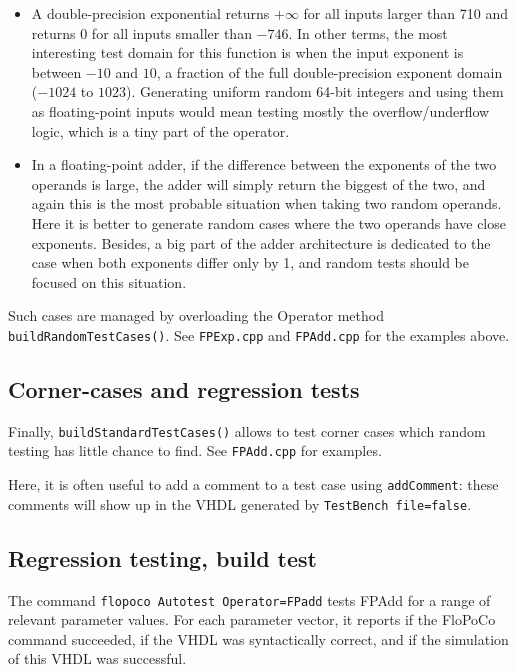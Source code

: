 \documentclass{article}
\begin{document}
\begin{itemize}\item 
  A double-precision exponential returns $+\infty$ for all inputs
  larger than 710 and returns $0$ for all inputs smaller than
  $-746$. In other terms, the most interesting test domain for this
  function is when the input exponent is between $-10$ and $10$, a
  fraction of the full double-precision exponent domain ($-1024$ to
  $1023$). Generating uniform random 64-bit integers and using them as
  floating-point inputs would mean testing mostly the
  overflow/underflow logic, which is a tiny part of the operator.


\item In a floating-point adder, if the difference between the
  exponents of the two operands is large, the adder will simply return
  the biggest of the two, and again this is the most probable
  situation when taking two random operands. Here it is better to
  generate random cases where the two operands have close
  exponents. Besides, a big part of the adder architecture is
  dedicated to the case when both exponents differ only by 1, and
  random tests should be focused on this situation.
\end{itemize}
Such cases are managed by overloading the Operator method  \texttt{\small buildRandomTestCases()}. 
See \texttt{FPExp.cpp} and \texttt{FPAdd.cpp} for the examples above.

\subsection{Corner-cases and regression tests}
Finally, \texttt{\small buildStandardTestCases()} allows to test corner cases which random testing has little chance to find.
See \texttt{\small FPAdd.cpp} for examples. 

Here, it is often useful to add a comment to a test case using \texttt{\small addComment}: these comments
will show up in the VHDL generated by \texttt{\small TestBench file=false}.


\subsection{Regression testing, build test }
The command \verb!flopoco Autotest Operator=FPadd! tests FPAdd for a range of relevant parameter values.
For each parameter vector, it reports if the FloPoCo command succeeded, if the VHDL was syntactically correct, and if the simulation of this VHDL was successful.
\end{document}
